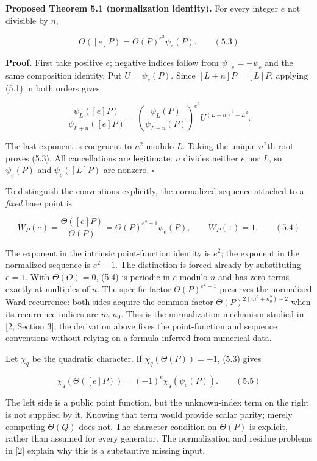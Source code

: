 \documentclass[
  11pt,
  a4paper,
]{article}
\begin{document}
\textbf{Proposed Theorem 5.1 (normalization identity).} For every
integer \(e\) not divisible by \(n\),

\[
\Theta([e]P)=\Theta(P)^{e^2}\psi_e(P). \qquad (5.3)
\]

\textbf{Proof.} First take positive \(e\); negative indices follow from
\(\psi_{-e}=-\psi_e\) and the same composition identity. Put
\(U=\psi_e(P)\). Since \([L+n]P=[L]P\), applying (5.1) in both orders
gives

\[
\frac{\psi_L([e]P)}{\psi_{L+n}([e]P)}
=\left(\frac{\psi_L(P)}{\psi_{L+n}(P)}\right)^{e^2}
 U^{(L+n)^2-L^2}.
\]

The last exponent is congruent to \(n^2\) modulo \(L\). Taking the
unique \(n^2\)th root proves (5.3). All cancellations are legitimate:
\(n\) divides neither \(e\) nor \(L\), so \(\psi_e(P)\) and
\(\psi_e([L]P)\) are nonzero. \(\square\)

To distinguish the conventions explicitly, the normalized sequence
attached to a \emph{fixed} base point is

\[
\widetilde W_P(e)=\frac{\Theta([e]P)}{\Theta(P)}
=\Theta(P)^{e^2-1}\psi_e(P),\qquad \widetilde W_P(1)=1. \qquad (5.4)
\]

The exponent in the intrinsic point-function identity is \(e^2\); the
exponent in the normalized sequence is \(e^2-1\). The distinction is
forced already by substituting \(e=1\). With \(\Theta(O)=0\), (5.4) is
periodic in \(e\) modulo \(n\) and has zero terms exactly at multiples
of \(n\). The specific factor \(\Theta(P)^{e^2-1}\) preserves the
normalized Ward recurrence: both sides acquire the common factor
\(\Theta(P)^{2(m^2+n_0^2)-2}\) when its recurrence indices are
\(m,n_0\). This is the normalization mechanism studied in {[}2, Section
3{]}; the derivation above fixes the point-function and sequence
conventions without relying on a formula inferred from numerical data.

Let \(\chi_q\) be the quadratic character. If \(\chi_q(\Theta(P))=-1\),
(5.3) gives

\[
\chi_q(\Theta([e]P))=(-1)^e\chi_q(\psi_e(P)). \qquad (5.5)
\]

The left side is a public point function, but the unknown-index term on
the right is not supplied by it. Knowing that term would provide scalar
parity; merely computing \(\Theta(Q)\) does not. The character condition
on \(\Theta(P)\) is explicit, rather than assumed for every generator.
The normalization and residue problems in {[}2{]} explain why this is a
substantive missing input.
\end{document}
